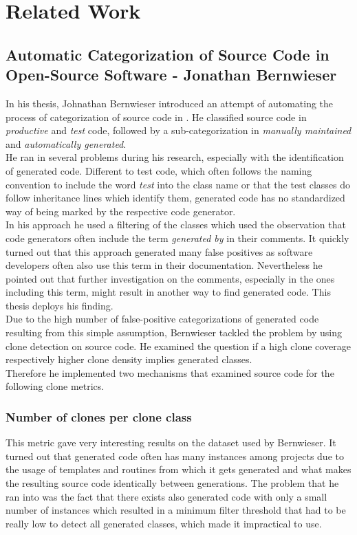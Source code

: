 
\chapter{Related Work}\label{chapter:related}

\section{Automatic Categorization of Source Code in Open-Source Software - Jonathan Bernwieser}

In his thesis, Johnathan Bernwieser introduced an attempt of automating the process of categorization of source code in \cite{Bernwieser2014}. He classified source code in \textit{productive} and \textit{test} code, followed by a sub-categorization in \textit{manually maintained} and \textit{automatically generated}.\\
He ran in several problems during his research, especially with the identification of generated code. Different to test code, which often follows the naming convention to include the word \textit{test} into the class name or that the test classes do follow inheritance lines which identify them, generated code has no standardized way of being marked by the respective code generator.\\
In his approach he used a filtering of the classes which used the observation that code generators often include the term \textit{generated by} in their comments. It quickly turned out that this approach generated many false positives as software developers often also use this term in their documentation. Nevertheless he pointed out that further investigation on the comments, especially in the ones including this term, might result in another way to find generated code. This thesis deploys his finding. \\
Due to the high number of false-positive categorizations of generated code resulting from this simple assumption, Bernwieser tackled the problem by using clone detection on source code. He examined the question if a high clone coverage respectively higher clone density implies generated classes.\\
Therefore he implemented two mechanisms that examined source code for the following clone metrics.

\subsection{Number of clones per clone class}
This metric gave very interesting results on the dataset used by Bernwieser. It turned out that generated code often has many instances among projects due to the usage of templates and routines from which it gets generated and what makes the resulting source code identically between generations. The problem that he ran into was the fact that there exists also generated code with only a small number of instances which resulted in a minimum filter threshold that had to be really low to detect all generated classes, which made it impractical to use.

